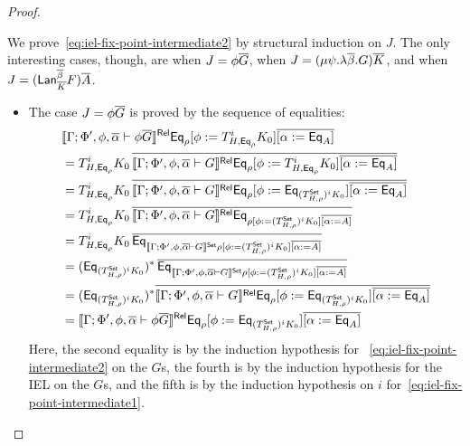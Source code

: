 \documentclass[acmsmall,review,anonymous]{acmart}
\theoremstyle{definition}
\begin{document}
\begin{proof}
\begin{itemize}
We prove~\eqref{eq:iel-fix-point-intermediate2} by structural
induction on $J$. The only interesting cases, though, are when $J =
\phi \overline{G}$, when $J = (\mu \psi.\lambda \overline{\beta}. G)\overline{K}$, and when
$J = (\mathsf{Lan}_{\overline{K}}^{\overline{\beta}} F)\overline{A}$.
\begin{itemize}
\item The case $J = \phi \overline{G}$ is proved by the sequence of equalities:
\[
\begin{split}
& \llbracket{\Gamma; \Phi', \phi, \overline{\alpha} \vdash \phi
    \overline{G}}\rrbracket^{\mathsf{Rel}} \mathsf{Eq}_{\rho} [\phi := T^i_{H,\mathsf{Eq}_{\rho}} K_0]
  \overline{[\alpha := \mathsf{Eq}_A]}
  \\
&= T^i_{H,\mathsf{Eq}_{\rho}} K_0\, \overline{\llbracket{\Gamma; \Phi',
      \phi, \overline{\alpha} \vdash G}\rrbracket^{\mathsf{Rel}} \mathsf{Eq}_{\rho} [\phi :=
      T^i_{H,\mathsf{Eq}_{\rho}} K_0] \overline{[\alpha :=
        \mathsf{Eq}_A]}} \\ 
&= T^i_{H,\mathsf{Eq}_{\rho}} K_0\, \overline{\llbracket{\Gamma; \Phi',
      \phi, \overline{\alpha} \vdash G}\rrbracket^{\mathsf{Rel}} \mathsf{Eq}_{\rho} [\phi :=
      \mathsf{Eq}_{(T^{\mathsf{Set}}_{H,\rho})^i K_0}] \overline{[\alpha :=
        \mathsf{Eq}_A]}} \\ 
&= T^i_{H,\mathsf{Eq}_{\rho}} K_0\, \overline{\llbracket{\Gamma; \Phi',
      \phi, \overline{\alpha} \vdash G}\rrbracket^{\mathsf{Rel}} \mathsf{Eq}_{\rho [\phi := (T^{\mathsf{Set}}_{H,\rho})^i
        K_0] \overline{[\alpha := A]}}} \\ 
&= T^i_{H,\mathsf{Eq}_{\rho}} K_0\, \overline{\mathsf{Eq}_{\llbracket{\Gamma;
        \Phi', \phi, \overline{\alpha} \vdash G}\rrbracket^{\mathsf{Set}} \rho [\phi :=
        (T^{\mathsf{Set}}_{H,\rho})^i K_0] \overline{[\alpha :=
          A]}}} \\ 
&= (\mathsf{Eq}_{(T^{\mathsf{Set}}_{H,\rho})^i K_0})^* \,\overline{\mathsf{Eq}_{\llbracket{\Gamma;
        \Phi', \phi, \overline{\alpha} \vdash G}\rrbracket^{\mathsf{Set}} \rho [\phi :=
        (T^{\mathsf{Set}}_{H,\rho})^i K_0] \overline{[\alpha :=
          A]}}} \\ 
&= (\mathsf{Eq}_{(T^{\mathsf{Set}}_{H,\rho})^i K_0})^* \overline{\llbracket{\Gamma;
      \Phi', \phi, \overline{\alpha} \vdash G}\rrbracket^{\mathsf{Rel}} \mathsf{Eq}_{\rho} [\phi :=
      \mathsf{Eq}_{(T^{\mathsf{Set}}_{H,\rho})^i K_0}] \overline{[\alpha :=
        \mathsf{Eq}_A]}} \\ 
&= \llbracket{\Gamma; \Phi', \phi, \overline{\alpha} \vdash \phi \overline{G}}\rrbracket^{\mathsf{Rel}}
  \mathsf{Eq}_{\rho} [\phi := \mathsf{Eq}_{(T^{\mathsf{Set}}_{H,\rho})^i K_0}]
  \overline{[\alpha := \mathsf{Eq}_A]} 
\end{split}
\]
Here, the second equality is by the induction hypothesis for
~\eqref{eq:iel-fix-point-intermediate2} on the $G$s, the fourth is by
the induction hypothesis for the IEL on the $G$s, and the fifth is by
the induction hypothesis on $i$
for~\eqref{eq:iel-fix-point-intermediate1}.


\end{itemize}
\end{itemize}
\end{proof}
\end{document}

